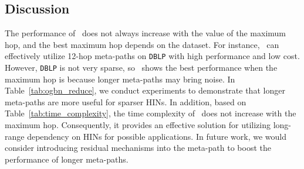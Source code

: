   
\subsection{Discussion}
The performance of \model~does not always increase with the value of the maximum hop, and the best maximum hop depends on the dataset. For instance, \model~can effectively utilize 12-hop meta-paths on \texttt{DBLP} with high performance and low cost.
However, \texttt{DBLP} is not very sparse, so \model~shows the best performance when the maximum hop is  because longer meta-paths may bring noise. In Table~\ref{tab:ogbn_reduce}, we conduct experiments to demonstrate that longer meta-paths are more useful for sparser HINs. 
In addition, based on Table~\ref{tab:time_complexity}, the time complexity of \model~does not increase with the maximum hop. Consequently, it provides an effective solution for utilizing long-range dependency on HINs for possible applications. In future work, we would consider introducing residual mechanisms into the meta-path to boost the performance of longer meta-paths.





 